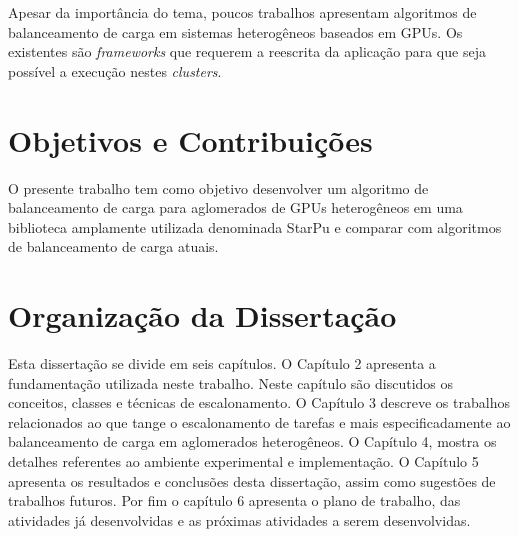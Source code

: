 Apesar da importância do tema, poucos trabalhos apresentam algoritmos de
balanceamento de carga em sistemas heterogêneos baseados em GPUs. Os existentes
são \emph{frameworks} que requerem a reescrita da aplicação para que seja
possível a execução nestes \emph{clusters}.


\section{Objetivos e Contribuições}\label{cap1:objetivos}

O presente trabalho tem como objetivo desenvolver um algoritmo de balanceamento de carga para aglomerados de GPUs heterogêneos em uma biblioteca amplamente utilizada denominada StarPu e comparar com algoritmos de balanceamento de carga atuais.  

\section{Organização da Dissertação}\label{cap1:organizacao}

Esta dissertação se divide em seis capítulos. O Capítulo 2 apresenta a fundamentação utilizada neste trabalho. Neste capítulo são discutidos os conceitos, classes e técnicas de escalonamento. O Capítulo 3 descreve os trabalhos relacionados ao que tange o escalonamento de tarefas e mais especificadamente ao balanceamento de carga em aglomerados heterogêneos.
O Capítulo 4, mostra os detalhes referentes ao ambiente experimental e implementação.
O Capítulo 5 apresenta os resultados e conclusões desta dissertação, assim como sugestões de trabalhos futuros.
Por fim o capítulo 6 apresenta o plano de trabalho, das atividades já desenvolvidas e as próximas atividades a serem desenvolvidas.


